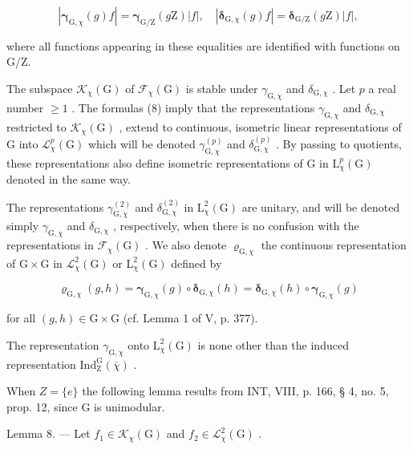 \[
| \boldsymbol {\gamma} _ {\mathrm{G}, \chi} (g) f | = \boldsymbol {\gamma} _ {\mathrm{G} / \mathrm{Z}} (g \mathrm{Z}) | f |, \quad | \boldsymbol {\delta} _ {\mathrm{G}, \chi} (g) f | = \boldsymbol {\delta} _ {\mathrm{G} / \mathrm{Z}} (g \mathrm{Z}) | f |,\tag{8}
\]

where all functions appearing in these equalities are identified with functions on G/Z.

 The subspace \(\mathcal{K}_{\chi}(\mathrm{G})\) of \(\mathcal{F}_{\chi}(\mathrm{G})\) is stable under \(\gamma_{\mathrm{G},\chi}\) and \(\delta_{\mathrm{G},\chi}\) . Let \(p\) a real number \(\geqslant 1\) . The formulas (8) imply that the representations \(\gamma_{\mathrm{G},\chi}\) and \(\delta_{\mathrm{G},\chi}\) restricted to \(\mathcal{K}_{\chi}(\mathrm{G})\) , extend to continuous, isometric linear representations of G into \(\mathcal{L}_{\chi}^{p}(\mathrm{G})\) which will be denoted \(\gamma_{\mathrm{G},\chi}^{(p)}\) and \(\delta_{\mathrm{G},\chi}^{(p)}\) . By passing to quotients, these representations also define isometric representations of G in \(\mathrm{L}_{\chi}^{p}(\mathrm{G})\) denoted in the same way.

 The representations \(\gamma_{\mathrm{G},\chi}^{(2)}\) and \(\delta_{\mathrm{G},\chi}^{(2)}\) in \(\mathrm{L}_{\chi}^{2}(\mathrm{G})\) are unitary, and will be denoted simply \(\gamma_{\mathrm{G},\chi}\) and \(\delta_{\mathrm{G},\chi}\) , respectively, when there is no confusion with the representations in \(\mathcal{F}_{\chi}(\mathrm{G})\) . We also denote \(\varrho_{\mathrm{G},\chi}\) the continuous representation of \(\mathrm{G} \times \mathrm{G}\) in \(\mathcal{L}_{\chi}^{2}(\mathrm{G})\) or \(\mathrm{L}_{\chi}^{2}(\mathrm{G})\) defined by

\[
\pmb {\varrho} _ {\mathrm{G}, \chi} (g, h) = \pmb {\gamma} _ {\mathrm{G}, \chi} (g) \circ \pmb {\delta} _ {\mathrm{G}, \chi} (h) = \pmb {\delta} _ {\mathrm{G}, \chi} (h) \circ \pmb {\gamma} _ {\mathrm{G}, \chi} (g)
\]

for all \((g,h)\in \mathrm{G}\times \mathrm{G}\) (cf. Lemma 1 of V, p. 377).

The representation \(\gamma_{\mathrm{G},\chi}\) onto \(\mathrm{L}_{\chi}^{2}(\mathrm{G})\) is none other than the induced representation \(\mathrm{Ind}_{\mathrm{Z}}^{\mathrm{G}}(\overline{\chi})\) .

When \(Z = \{e\}\) the following lemma results from INT, VIII, p. 166, § 4, no. 5, prop. 12, since G is unimodular.

Lemma 8. --- Let \(f_1 \in \mathcal{K}_\chi(\mathrm{G})\) and \(f_2 \in \mathcal{L}_\chi^2(\mathrm{G})\) .


